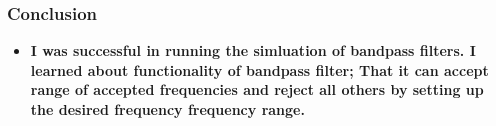 \documentclass[11pt]{article}
\providecommand{\tightlist}{%
      \setlength{\itemsep}{0pt}\setlength{\parskip}{0pt}}
\begin{document}
\hypertarget{conclusion}{%
\subsubsection{Conclusion}\label{conclusion}}

\begin{itemize}
\tightlist
\item
  \textbf{I was successful in running the simluation of bandpass
  filters. I learned about functionality of bandpass filter; That it can
  accept range of accepted frequencies and reject all others by setting
  up the desired frequency frequency range.}
\end{itemize}


    
    
    
    
\end{document}
